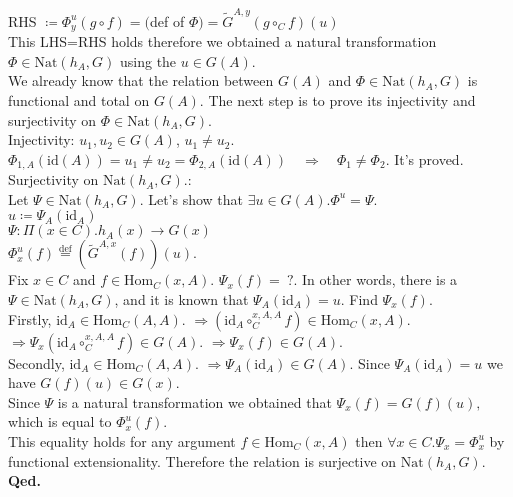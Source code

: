 \documentclass[10pt,a4paper]{article}
\theoremstyle{definition}
\newcommand{\Hom}{{\mbox{Hom}}}
\newcommand{\Nat}{{\mbox{Nat}}}
\newcommand{\GMor}{{\widetilde{G}\mbox{}}}
\newcommand{\id}{{\mbox{id}}}
\newcommand{\defi}{{\mbox{def}}}
\newcommand{\eqdef}{{\stackrel{\defi}{=}}}
\newcommand{\myqed}{\noindent\textbf{Qed.}}
\begin{document}
RHS $\coloneqq \Phi^u_y(g\circ f)=($def of $\Phi)=\GMor^{A,y}\left(g\circ_C f\right)(u)$\\
This LHS=RHS holds therefore we obtained a natural transformation $\Phi\in\Nat(h_A,G)$ using the $u\in G(A)$.\\
We already know that the relation between $G(A)$ and $\Phi\in\Nat(h_A,G)$ is functional and total on $G(A)$.
The next step is to prove its injectivity and surjectivity on $\Phi\in\Nat(h_A,G)$.\\
Injectivity: $u_1,u_2\in G(A)$, $u_1\neq u_2$.\\
$\Phi_{1,A}(\id(A))= u_1\neq u_2 = \Phi_{2,A}(\id(A))\quad \Longrightarrow \quad \Phi_1 \neq \Phi_2$. It's proved. \\
Surjectivity on $\Nat(h_A,G)$.:\\
Let $\Psi\in\Nat(h_A,G)$. Let's show that $\exists u\in G(A).\Phi^u=\Psi$.\\
$u\coloneqq \Psi_A(\id_A)$\\
$\Psi:\Pi(x\in C). h_A(x)\to G(x)$\\
$\Phi^u_x(f) \eqdef (\GMor^{A,x}(f))(u)$.\\
Fix $x\in C$ and $f\in\Hom_C(x,A)$. $\Psi_x(f)=\ ?$.
In other words, there is a $\Psi\in\Nat(h_A,G)$, and it is known that $\Psi_A(\id_A) = u$. Find $\Psi_x(f)$.\\
Firstly, $\id_A \in \Hom_C(A,A)$. $\Longrightarrow (\id_A \circ_C^{x,A,A} f) \in \Hom_C(x,A)$. $\Longrightarrow \Psi_x(\id_A \circ_C^{x,A,A} f)\in G(A)$. $\Longrightarrow \Psi_x(f)\in G(A)$.\\
Secondly, $\id_A \in \Hom_C(A,A)$. $\Longrightarrow \Psi_A(\id_A) \in G(A)$. Since $\Psi_A(\id_A)=u$ we have $G(f)(u)\in G(x)$.\\
Since $\Psi$ is a natural transformation we obtained that $\Psi_x(f)=G(f)(u),$ which is equal to $\Phi^u_x(f)$.\\
This equality holds for any argument $f\in \Hom_C(x,A)$ then $\forall x\in C. \Psi_x=\Phi^u_x$ by functional extensionality. Therefore the relation is surjective on $\Nat(h_A,G)$.
\myqed\\
\end{document}
